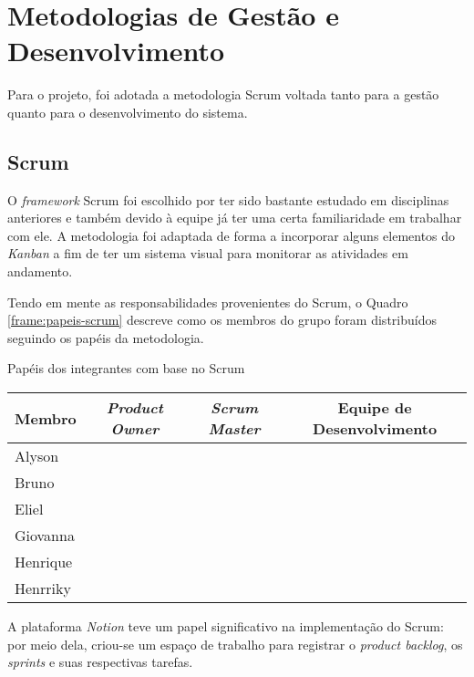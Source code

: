 \section{Metodologias de Gestão e Desenvolvimento}

\label{section:metolodogia-gestao}

Para o projeto, foi adotada a metodologia Scrum \cite{scrum-2024} voltada tanto para a gestão quanto para o desenvolvimento do sistema.

\subsection{Scrum}

O \textit{framework} Scrum foi escolhido por ter sido bastante estudado em disciplinas anteriores e também devido à equipe já ter uma certa familiaridade em trabalhar com ele. A metodologia foi adaptada de forma a incorporar alguns elementos do \emph{Kanban} \cite{kanban-2023} a fim de ter um sistema visual para monitorar as atividades em andamento.

Tendo em mente as responsabilidades provenientes do Scrum, o Quadro \ref{frame:papeis-scrum} descreve como os membros do grupo foram distribuídos seguindo os papéis da metodologia.

\begin{quadro}[ht]
	\setlength{\tabcolsep}{3pt}
	\begin{center}
		\caption{\label{frame:papeis-scrum}Papéis dos integrantes com base no Scrum}
		\begin{tabular}{|l|c|c|c|}
			\hline
			\textbf{Membro} & \textbf{\textit{Product Owner}} & \textbf{\textit{Scrum Master}} & \textbf{Equipe de Desenvolvimento} \\
			\hline
			Alyson &  & \checkmark & \checkmark \\
			\hline
			Bruno &  &  & \checkmark \\
			\hline
			Eliel &  &  & \checkmark \\
			\hline
			Giovanna &  &  & \checkmark \\
			\hline
			Henrique &  &  & \checkmark \\
			\hline
			Henrriky & \checkmark &  & \checkmark \\
			\hline
		\end{tabular}
	\end{center}
\end{quadro}

A plataforma \emph{Notion} \cite{notion-2025} teve um papel significativo na implementação do Scrum: por meio dela, criou-se um espaço de trabalho para registrar o \textit{product backlog}, os \textit{sprints} e suas respectivas tarefas.

